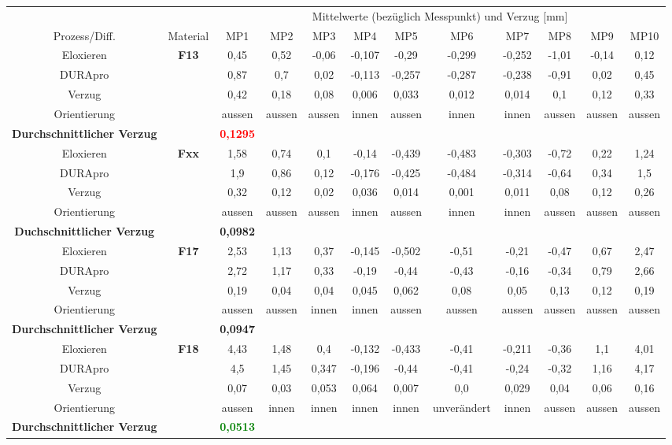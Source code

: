 \documentclass[12pt,a4paper,parskip,twoside,BCOR5mm,headsepline]{scrartcl}
\begin{document}
\begin{description*}
\begin{table}
\begin{tabular}{cccccccccccc}
\toprule
&& \multicolumn{10}{c}{Mittelwerte (bezüglich Messpunkt) und Verzug [\si{\milli\meter}]} \\
\cmidrule(2){3-12}
Prozess/Diff. & Material & MP1 & MP2 & MP3 & MP4 & MP5 & MP6 & MP7 & MP8 & MP9 & MP10 \\
\midrule
Eloxieren & \textbf{F13} &0,45 &0,52  &-0,06  &-0,107  &-0,29  &-0,299  &-0,252  &-1,01  &-0,14  &0,12  \\
DURApro &&0,87  &0,7  &0,02  &-0,113  &-0,257  & -0,287 &-0,238  &-0,91  &0,02  &0,45  \\
Verzug &&0,42  & 0,18 &0,08  &0,006  &0,033  &0,012  &0,014  &0,1  & 0,12 &0,33  \\
Orientierung &&aussen &aussen  &aussen  &innen  & aussen &innen  & innen &aussen  &aussen  &aussen  \\
\textbf{Durchschnittlicher Verzug} &&\textbf{\textcolor{red}{0,1295}}&&&&&&&&&\\
\midrule
Eloxieren & \textbf{Fxx} & 1,58 & 0,74 &0,1  &-0,14  &-0,439  &-0,483  &-0,303  &-0,72  &0,22  &1,24 \\
DURApro &&1,9  &0,86  & 0,12 &-0,176  &-0,425  &-0,484  & -0,314 &-0,64  & 0,34 & 1,5 \\
Verzug &&0,32  &0,12  & 0,02 &0,036  &0,014  &0,001  &0,011  & 0,08 & 0,12 & 0,26 \\
Orientierung &&aussen  &aussen  &aussen  & innen & aussen & innen &innen  &aussen  & aussen &aussen  \\
\textbf{Duchschnittlicher Verzug} && \textbf{0,0982}&&&&&&&&&\\
\midrule
Eloxieren & \textbf{F17} &2,53  &1,13  &0,37  &-0,145  &-0,502  &-0,51  & -0,21 &-0,47  &0,67  & 2,47 \\
DURApro &&2,72  &1,17  &0,33  &-0,19  &-0,44   &-0,43   &-0,16   & -0,34 & 0,79 & 2,66  \\
Verzug && 0,19 & 0,04 &0,04  & 0,045 &0,062  &0,08  &0,05   & 0,13 &0,12  &0,19  \\
Orientierung && aussen &aussen  &innen &innen  & aussen & aussen &aussen  &aussen  & aussen &aussen  \\
\textbf{Durchschnittlicher Verzug} && \textbf{0,0947} &&&&&&&&&\\
\midrule
Eloxieren & \textbf{F18} &4,43  &1,48  &0,4  & -0,132 & -0,433 &-0,41  & -0,211 &-0,36  &1,1  & 4,01  \\
DURApro &&4,5  &1,45  & 0,347 & -0,196  &-0,44  &-0,41  &-0,24  &-0,32 &1,16  & 4,17 \\
Verzug && 0,07 &0,03  &0,053  &0,064  &0,007  &0,0  & 0,029 & 0,04 &0,06  & 0,16 \\
Orientierung && aussen &innen  &innen  & innen & innen &unverändert  & innen &aussen  &aussen  & aussen \\
\textbf{Durchschnittlicher Verzug} && \textbf{\textcolor{green}{0,0513}} &&&&&&&&&\\
\bottomrule


\end{tabular}
\end{table}
\end{description*}
\end{document}
